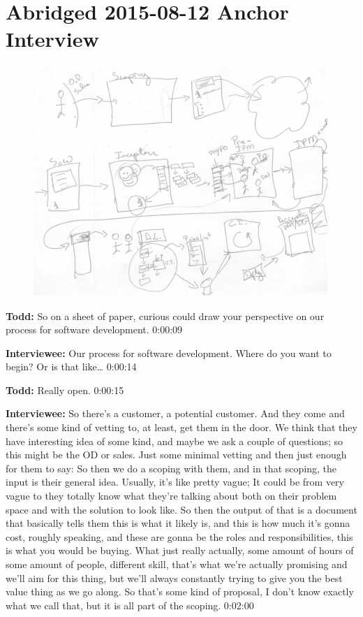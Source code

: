 \section{Abridged 2015-08-12 Anchor Interview}

\begin{figure}[h]
\centering
\includegraphics[width=6.5in]{interviews/drawings/2015_08_12_anchor.png}
\caption{}
\label{2015_08_12_anchor}
\end{figure}

\textbf{Todd:} 	So on a sheet of paper, curious could draw your perspective on our process for software development. 0:00:09

\textbf{Interviewee:}  	Our process for software development.  Where do you want to begin?  Or is that like…  0:00:14

\textbf{Todd:}   Really open.  0:00:15

\textbf{Interviewee:}  	So there's a customer, a potential customer.  And they come and there's some kind of vetting to, at least, get them in the door.  We think that they have interesting idea of some kind, and maybe we ask a couple of questions; so this might be the OD or sales.  Just some minimal vetting and then just enough for them to say:   So then we do a scoping with them, and in that scoping, the input is their general idea.  Usually, it's like pretty vague; It could be from very vague to they totally know what they're talking about both on their problem space and with the solution to look like.  So then the output of that is a document that basically tells them this is what it likely is, and this is how much it's gonna cost, roughly speaking, and these are gonna be the roles and responsibilities, this is what you would be buying.  What just really actually, some amount of hours of some amount of people, different skill, that's what we're actually promising and we'll aim for this thing, but we'll always constantly trying to give you the best value thing as we go along.  So that's some kind of proposal, I don't know exactly what we call that, but it is all part of the scoping.  0:02:00


